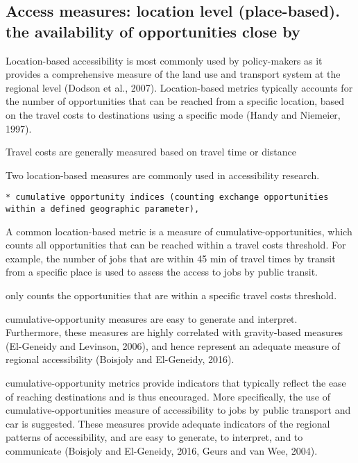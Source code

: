 \documentclass[12pt,]{article}
\begin{document}
\hypertarget{access-measures-location-level-place-based.-the-availability-of-opportunities-close-by}{%
\subsection{Access measures: location level (place-based). the
availability of opportunities close
by}\label{access-measures-location-level-place-based.-the-availability-of-opportunities-close-by}}

Location-based accessibility is most commonly used by policy-makers as
it provides a comprehensive measure of the land use and transport system
at the regional level (Dodson et al., 2007). Location-based metrics
typically accounts for the number of opportunities that can be reached
from a specific location, based on the travel costs to destinations
using a specific mode (Handy and Niemeier, 1997).

Travel costs are generally measured based on travel time or distance

Two location-based measures are commonly used in accessibility research.

\begin{verbatim}
* cumulative opportunity indices (counting exchange opportunities within a defined geographic parameter), 
\end{verbatim}

A common location-based metric is a measure of cumulative-opportunities,
which counts all opportunities that can be reached within a travel costs
threshold. For example, the number of jobs that are within 45 min of
travel times by transit from a specific place is used to assess the
access to jobs by public transit.

only counts the opportunities that are within a specific travel costs
threshold.

cumulative-opportunity measures are easy to generate and interpret.
Furthermore, these measures are highly correlated with gravity-based
measures (El-Geneidy and Levinson, 2006), and hence represent an
adequate measure of regional accessibility (Boisjoly and El-Geneidy,
2016).

cumulative-opportunity metrics provide indicators that typically reflect
the ease of reaching destinations and is thus encouraged. More
specifically, the use of cumulative-opportunities measure of
accessibility to jobs by public transport and car is suggested. These
measures provide adequate indicators of the regional patterns of
accessibility, and are easy to generate, to interpret, and to
communicate (Boisjoly and El-Geneidy, 2016, Geurs and van Wee, 2004).
\end{document}
